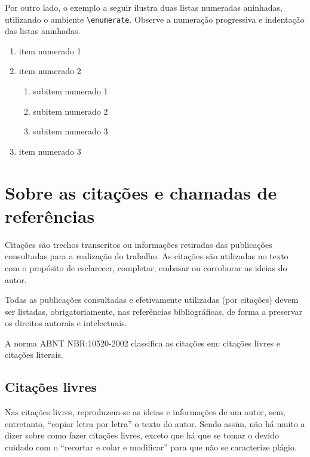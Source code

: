 \begin{apendicesenv}
    Por outro lado, o exemplo a seguir ilustra duas listas numeradas aninhadas, utilizando o ambiente \verb|\enumerate|.
    Observe a numeração progressiva e indentação das listas aninhadas.

    \begin{enumerate}
        \item item numerado 1
        \item item numerado 2
              \begin{enumerate}
                  \item subitem numerado 1
                  \item subitem numerado 2
                  \item subitem numerado 3
              \end{enumerate}
        \item item numerado 3
    \end{enumerate}


    \chapter{Sobre as citações e chamadas de referências}
    \label{chap_sobre_as_citacoes}

    Citações são trechos transcritos ou informações retiradas das publicações consultadas para a realização do trabalho.
    As citações são utilizadas no texto com o propósito de esclarecer, completar, embasar ou corroborar as ideias do autor.

    Todas as publicações consultadas e efetivamente utilizadas (por citações) devem ser listadas, obrigatoriamente, nas referências bibliográficas, de forma a preservar os direitos autorais e intelectuais.

    A norma ABNT NBR:10520-2002 classifica as citações em: citações livres e citações literais.

    \section{Citações livres}
    \label{sec_citacoes_livres}

    Nas citações livres, reproduzem-se as ideias e informações de um autor, sem, entretanto, ``copiar letra por letra'' o texto do autor.
    Sendo assim, não há muito a dizer sobre como fazer citações livres, exceto que há que se tomar o devido cuidado com o ``recortar e colar e modificar'' para que não se caracterize plágio.


\end{apendicesenv}
